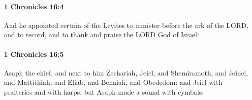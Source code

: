 		\paragraph{1 Chronicles 16:4} %
			\label{1CHRONICLES-16-4}

			And he appointed certain of the Levites to minister before the ark of the LORD, and to record, and to thank and praise the LORD God of Israel:


		\paragraph{1 Chronicles 16:5} %
			\label{1CHRONICLES-16-5}

			Asaph the chief, and next to him Zechariah, Jeiel, and Shemiramoth, and Jehiel, and Mattithiah, and Eliab, and Benaiah, and Obededom: and Jeiel with psalteries and with harps; but Asaph made a sound with cymbals;

